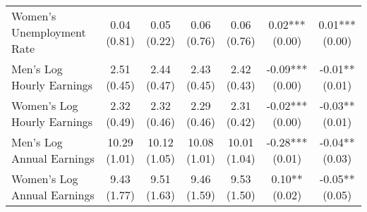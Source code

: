 \begin{ThreePartTable}
\begin{longtable}[t]{>{\raggedright\arraybackslash}p{5cm}cccccc}
\addlinespace
\hspace{1em}Women's Unemployment Rate & \specialcell{0.04\\(0.81)} & \specialcell{0.05\\(0.22)} & \specialcell{0.06\\(0.76)} & \specialcell{0.06\\(0.76)} & \specialcell{0.02***\\(0.00)} & \specialcell{0.01***\\(0.00)}\\
\hspace{1em}Men's Log Hourly Earnings & \specialcell{2.51\\(0.45)} & \specialcell{2.44\\(0.47)} & \specialcell{2.43\\(0.45)} & \specialcell{2.42\\(0.43)} & \specialcell{-0.09***\\(0.00)} & \specialcell{-0.01**\\(0.01)}\\
\hspace{1em}Women's Log Hourly Earnings & \specialcell{2.32\\(0.49)} & \specialcell{2.32\\(0.46)} & \specialcell{2.29\\(0.46)} & \specialcell{2.31\\(0.42)} & \specialcell{-0.02***\\(0.00)} & \specialcell{-0.03**\\(0.01)}\\
\hspace{1em}Men's Log Annual Earnings & \specialcell{10.29\\(1.01)} & \specialcell{10.12\\(1.05)} & \specialcell{10.08\\(1.01)} & \specialcell{10.01\\(1.04)} & \specialcell{-0.28***\\(0.01)} & \specialcell{-0.04**\\(0.03)}\\
\hspace{1em}Women's Log Annual Earnings & \specialcell{9.43\\(1.77)} & \specialcell{9.51\\(1.63)} & \specialcell{9.46\\(1.59)} & \specialcell{9.53\\(1.50)} & \specialcell{0.10**\\(0.02)} & \specialcell{-0.05**\\(0.05)}\\

\end{longtable}
\end{ThreePartTable}
